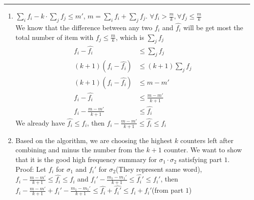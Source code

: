 \documentclass[11pt]{article}
\begin{document}




\begin{quote}

\end{quote}
\hrule


\begin{solution}
\item
\begin{enumerate}
    \item  $\sum_i f_i - k \cdot \sum_j f_j \leq m'$, $m = \sum_i f_i + \sum_j f_j$.  $\forall {f_i > \frac{m}{k}}, \forall {f_j \leq \frac{m}{k}}$\\
    We know that the difference between any two $f_i$ and $\hat{f_i}$ will be get most the total number of item with $f_j \leq \frac{m}{k}$, which is $\sum_j f_j$ \\
    \begin{align*}
        f_i - \hat {f_i}
        &\leq \sum_j f_j\\
        (k + 1) (f_i - \hat {f_i})
        &\leq (k+1) \sum_j f_j \\
        (k + 1) (f_i - \hat {f_i}) &\leq m - m' \\
        f_i - \hat {f_i} &\leq \frac{m - m'}{k+1} \\
        f_i - \frac{m - m'}{k+1}  &\leq \hat {f_i}
    \end{align*}    
    We already have $\hat{f_i} \leq f_i$, then $f_i - \frac{m - m'}{k+1} \leq \hat {f_i} \leq f_i$
    \item  Based on the algorithm, we are choosing the highest $k$ counters left after combining and minus the number from the $k+1$ counter. We want to show that it is the good high frequency summary for $\sigma_1 \cdot \sigma_2$ satisfying part $1$.\\
    
    Proof: Let $f_i$ for $\sigma_1$ and $f_i'$ for $\sigma_2$(They represent same word), $f_i - \frac{m - m'}{k+1} \leq \hat {f_i} \leq f_i$ and $f_i' - \frac{m_1 - m_1'}{k+1} \leq \hat {f_i'} \leq f_i'$, then $f_i - \frac{m - m'}{k+1} + f_i' - \frac{m_1 - m_1'}{k+1} \leq \hat {f_i} + \hat {f_i'} \leq f_i + f_i'$(from part $1$)\\
    

\end{enumerate}
\end{solution}
\end{document}

